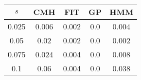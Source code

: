 \centering \begin{tabular}{c|c|c|c|c}
$s$	&CMH	&FIT	&GP	&HMM\\\hline
0.025	&0.006	&0.002	&0.0	&0.004\\
0.05	&0.02	&0.002	&0.0	&0.002\\
0.075	&0.024	&0.004	&0.0	&0.008\\
0.1	&0.06	&0.004	&0.0	&0.038\\
\end{tabular}
